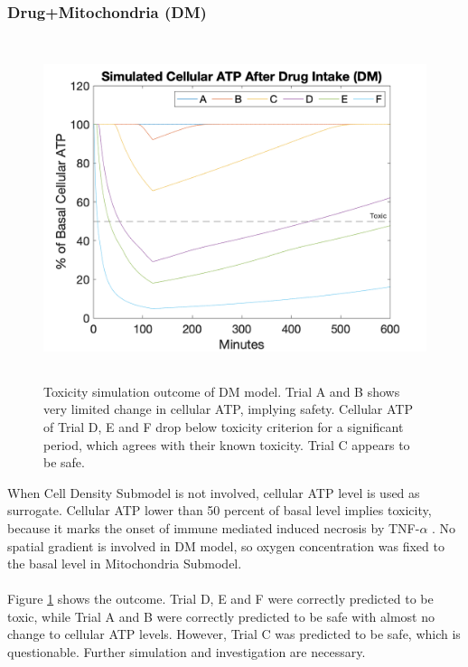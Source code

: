 \documentclass[12pt]{article}
\begin{document}
\subsubsection{Drug+Mitochondria (DM)}
\begin{figure}[h!]
\centering
\includegraphics[width = 12cm, height =10cm]{dm.png}
\caption{Toxicity simulation outcome of DM model. Trial A and B shows very limited change in cellular ATP, implying safety. Cellular ATP of Trial D, E and F drop below toxicity criterion for a significant period, which agrees with their known toxicity. Trial C appears to be safe.}
\label{fig:dm}
\end{figure}
When Cell Density Submodel is not involved, cellular ATP level is used as surrogate. Cellular ATP lower than 50 percent of basal level implies toxicity, because it marks the onset of immune mediated induced necrosis by TNF-$\alpha$ \cite{leistIntracellularAdenosineTriphosphate1997a,nieminenATPDepletionRather1994a,cannonEffectsFructoseAdenosine1991}. No spatial gradient is involved in DM model, so oxygen concentration was fixed to the basal level in Mitochondria Submodel.\\\\
Figure \ref{fig:dm} shows the outcome. Trial D, E and F were correctly predicted to be toxic, while Trial A and B were correctly predicted to be safe with almost no change to cellular ATP levels. However, Trial C was predicted to be safe, which is questionable. Further simulation and investigation are necessary.
\end{document}
